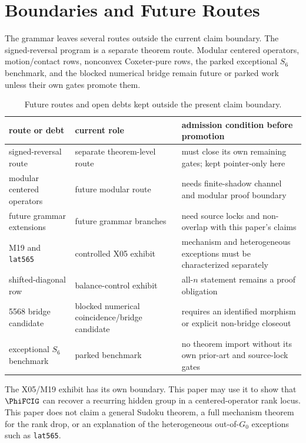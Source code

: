 \section{Boundaries and Future Routes}

The grammar leaves several routes outside the current claim boundary.  The signed-reversal program is a separate theorem route.  Modular centered operators, motion/contact rows, nonconvex Coxeter-pure rows, the parked exceptional \(S_6\) benchmark, and the blocked numerical bridge remain future or parked work unless their own gates promote them.

\begin{table}[ht]
\centering
\caption{Future routes and open debts kept outside the present claim boundary.}
\label{tab:future-routes}
\begin{tabular}{@{}L{0.18\textwidth}L{0.32\textwidth}L{0.40\textwidth}@{}}
\toprule
route or debt & current role & admission condition before promotion \\
\midrule
signed-reversal route & separate theorem-level route & must close its own remaining gates; kept pointer-only here \\
modular centered operators & future modular route & needs finite-shadow channel and modular proof boundary \\
future grammar extensions & future grammar branches & need source locks and non-overlap with this paper's claims \\
M19 and \texttt{lat565} & controlled X05 exhibit & mechanism and heterogeneous exceptions must be characterized separately \\
shifted-diagonal row & balance-control exhibit & all-\(n\) statement remains a proof obligation \\
5568 bridge candidate & blocked numerical coincidence/bridge candidate & requires an identified morphism or explicit non-bridge closeout \\
exceptional \(S_6\) benchmark & parked benchmark & no theorem import without its own prior-art and source-lock gates \\
\bottomrule
\end{tabular}
\end{table}

The X05/M19 exhibit has its own boundary.  This paper may use it to show that \(\PhiFCIG\) can recover a recurring hidden group in a centered-operator rank locus.  This paper does not claim a general Sudoku theorem, a full mechanism theorem for the rank drop, or an explanation of the heterogeneous out-of-\(G_0\) exceptions such as \texttt{lat565}.

